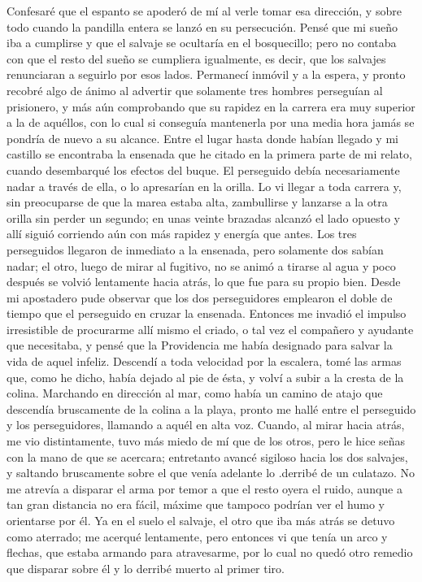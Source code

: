 \documentclass{novela}
\begin{document}
    Confesaré que el espanto se apoderó de mí al verle tomar esa dirección, y sobre todo cuando la pandilla entera se lanzó en su persecución. Pensé que mi sueño iba a cumplirse y que el salvaje se ocultaría en el bosquecillo; pero no contaba con que el resto del sueño se cumpliera igualmente, es decir, que los salvajes renunciaran a seguirlo por esos lados. Permanecí inmóvil y a la espera, y pronto recobré algo de ánimo al advertir que solamente tres hombres perseguían al prisionero, y más aún comprobando que su rapidez en la carrera era muy superior a la de aquéllos, con lo cual si conseguía mantenerla por una media hora jamás se pondría de nuevo a su alcance.
    Entre el lugar hasta donde habían llegado y mi castillo se encontraba la ensenada que he citado en la primera parte de mi relato, cuando desembarqué los efectos del buque. El perseguido debía necesariamente nadar a través de ella, o lo apresarían en la orilla. Lo vi llegar a toda carrera y, sin preocuparse de que la marea estaba alta, zambullirse y lanzarse a la otra orilla sin perder un segundo; en unas veinte brazadas alcanzó el lado opuesto y allí siguió corriendo aún con más rapidez y energía que antes. Los tres perseguidos llegaron de inmediato a la ensenada, pero solamente dos sabían nadar; el otro, luego de mirar al fugitivo, no se animó a tirarse al agua y poco después se volvió lentamente hacia atrás, lo que fue para su propio bien.
    Desde mi apostadero pude observar que los dos perseguidores emplearon el doble de tiempo que el perseguido en cruzar la ensenada. Entonces me invadió el impulso irresistible de procurarme allí mismo el criado, o tal vez el compañero y ayudante que necesitaba, y pensé que la Providencia me había designado para salvar la vida de aquel infeliz. Descendí a toda velocidad por la escalera, tomé las armas que, como he dicho, había dejado al pie de ésta, y volví a subir a la cresta de la colina.
    Marchando en dirección al mar, como había un camino de atajo que descendía bruscamente de la colina a la playa, pronto me hallé entre el perseguido y los perseguidores, llamando a aquél en alta voz. Cuando, al mirar hacia atrás, me vio distintamente, tuvo más miedo de mí que de los otros, pero le hice señas con la mano de que se acercara; entretanto avancé sigiloso hacia los dos salvajes, y saltando bruscamente sobre el que venía adelante lo .derribé de un culatazo. No me atrevía a disparar el arma por temor a que el resto oyera el ruido, aunque a tan gran distancia no era fácil, máxime que tampoco podrían ver el humo y orientarse por él. Ya en el suelo el salvaje, el otro que iba más atrás se detuvo como aterrado; me acerqué lentamente, pero entonces vi que tenía un arco y flechas, que estaba armando para atravesarme, por lo cual no quedó otro remedio que disparar sobre él y lo derribé muerto al primer tiro.
\end{document}
